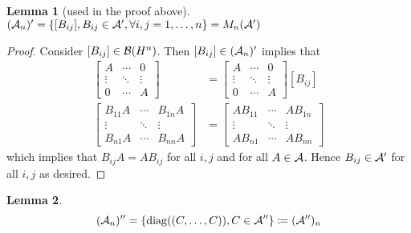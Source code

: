 \documentclass[10pt,english,a4paper]{article}
\theoremstyle{definition}
\newtheorem*{lemma}{Lemma}
\DeclareMathOperator{\diag}{diag}
\begin{document}
\begin{lemma}[used in the proof above]
    $(\mathcal{A}_n)' = \{[B_{ij}], B_{ij} \in \mathcal{A}', \forall i,j = 1,\ldots,n\} = M_n(\mathcal{A}')$
\end{lemma}
\begin{proof}
    Consider $[B_{ij}] \in \mathcal{B}(H^n)$. 
Then $[B_{ij}] \in (\mathcal{A}_n)'$ implies that 
\begin{align*}
    [B_{ij}]
\begin{bmatrix} A &\cdots & 0 \\ \vdots &\ddots &\vdots\\ 0 &\cdots &A \end{bmatrix}
&= 
\begin{bmatrix} A &\cdots & 0 \\ \vdots &\ddots &\vdots\\ 0 &\cdots &A \end{bmatrix}
[B_{ij}] \\
\begin{bmatrix} B_{11}A &\cdots & B_{1n}A \\ \vdots &\ddots &\vdots\\ B_{n1}A &\cdots &B_{nn}A \end{bmatrix}
&= 
\begin{bmatrix} AB_{11} &\cdots & AB_{1n} \\ \vdots &\ddots &\vdots\\ AB_{n1} &\cdots &AB_{nn} \end{bmatrix}
\end{align*}
which implies that 
$B_{ij}A = AB_{ij}$ for all $i,j$ and for all $A \in \mathcal{A}$. Hence
$B_{ij} \in \mathcal{A}'$ for all $i,j$ as desired. 
\end{proof}

\begin{lemma}
    \[(\As_n)'' = \left\{\diag((C,\ldots, C)), C \in \As''\right\} \coloneqq (\As'')_n\]
\end{lemma}
\end{document}
